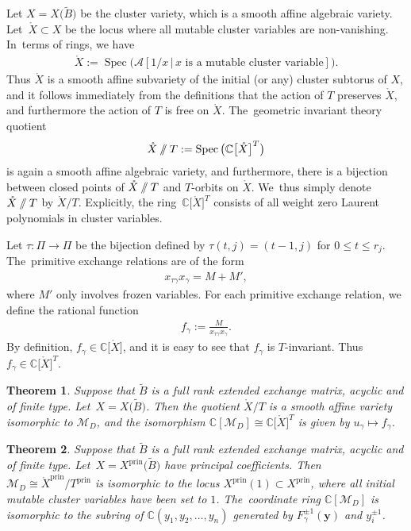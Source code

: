 \documentclass[pdftex]{sigma}%
\def\C{{\mathbb C}}
\def\A{{\mathcal{A}}}
\def\Xo{{\mathring{X}}}
\def\Spec{\operatorname{Spec}}
\def\prin{{\operatorname{prin}}}
\def\tB{{\tilde B}}
\def\M{{\mathcal{M}}}
\def\tB{{\tilde B}}
\def\y{{\mathbf y}}
\newcommand{\sslash}{\mathbin{/\mkern-6mu/}}
\numberwithin{equation}{section}
\newtheorem{Theorem}{Theorem}[section]
\begin{document}
Let $X = X\big(\tB\big)$ be the cluster variety, which is a smooth affine algebraic variety. Let~$\Xo \subset X$ be the locus where all mutable cluster variables are non-vanishing. In~terms of rings, we have
\begin{gather*}
\Xo:= \Spec\big(\A[1/x \,|\, x \text{ is a mutable cluster variable}]\big).
\end{gather*}
Thus $\Xo$ is a smooth affine subvariety of the initial (or any) cluster subtorus of $X$, and it follows immediately from the definitions that the action of $T$ preserves $\Xo$, and furthermore the action of $T$ is free on $\Xo$. The~geometric invariant theory quotient
\begin{gather*}
\Xo \sslash T:= \Spec\big(\C\big[\Xo\big]^T\big)
\end{gather*}
is again a smooth affine algebraic variety, and furthermore, there is a bijection between closed points of $\Xo \sslash T$ and $T$-orbits on $\Xo$. We~thus simply denote $\Xo\sslash T$ by $\Xo/T$. %
Explicitly, the ring~$\C\big[\Xo\big]^T$ consists of all weight zero Laurent polynomials in cluster variables.

\bigskip{}
Let $\tau\colon \Pi \to \Pi$ be the bijection defined by $\tau(t,j) = (t-1,j)$ for $0 \leq t \leq r_j$. The~primitive exchange relations are of the form
\begin{gather*}
x_{\tau \gamma} x_{\gamma} = M + M',
\end{gather*}
where $M'$ only involves frozen variables. For each primitive exchange relation, we define the rational function
\begin{gather*}
f_\gamma := \frac{M}{x_{\tau \gamma} x_{\gamma}}.
\end{gather*}
By definition, $f_\gamma \in \C\big[\Xo\big]$, and it is easy to see that $f_\gamma$ is $T$-invariant. Thus $f_\gamma \in \C\big[\Xo\big]^T$.

\begin{Theorem}\label{thm:fullrank}
Suppose that $\tB$ is a full rank extended exchange matrix, acyclic and of finite type. Let~$X= X\big(\tB\big)$. Then the quotient $\Xo/T$ is a smooth affine variety isomorphic to $\M_D$, and the isomorphism $\C[\M_D] \cong \C\big[\Xo\big]^T$ is given by $u_\gamma \mapsto f_\gamma$.
\end{Theorem}

\begin{Theorem}\label{thm:principal}
Suppose that $\tB$ is a full rank extended exchange matrix, acyclic and of finite type. Let~$X= X^\prin\big(\tB\big)$ have principal coefficients. Then $\M_D \cong \Xo^\prin/T^\prin$ is isomorphic to the locus $X^\prin(1) \subset X^\prin$, where all initial mutable cluster variables have been set to $1$. The~coordinate ring $\C[\M_D]$ is isomorphic to the subring of $\C(y_1,y_2,\dots,y_n)$ generated by $F_\gamma^{\pm 1}(\y)$ and $y_i^{\pm 1}$.
\end{Theorem}
\end{document}
